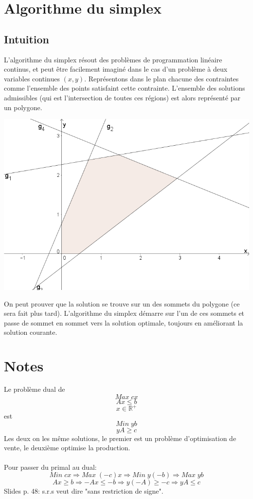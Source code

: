 \documentclass[a4paper]{report}
\theoremstyle{definition}
\theoremstyle{remark}
\theoremstyle{plain}
\begin{document}
\section{Algorithme du simplex}
\subsection{Intuition}
L'algorithme du simplex résout des problèmes de programmation linéaire continus,
et peut être facilement imaginé dans le cas d'un problème à deux variables
continues \((x,y)\). Représentons dans le plan chacune des contraintes comme
l'ensemble des points satisfaint cette contrainte. L'ensemble des solutions
admissibles (qui est l'intersection de toutes ces régions) est alors représenté
par un polygone.
\begin{center}\textbf{\textbf{}}
\includegraphics[width=\textwidth]{simplex-xy.png}
\end{center}
On peut prouver que la solution se trouve sur un des sommets du polygone (ce
sera fait plus tard). L'algorithme du simplex démarre sur l'un de ces sommets et
passe de sommet en sommet vers la solution optimale, toujours en améliorant la
solution courante.

\section{Notes}
Le problème dual de
\[Max\;cx\]
\[Ax\le b\]
\[x\in\mathbb{R}^+\]
est
\[Min\;yb\]
\[yA\ge c\]
Les deux on les même solutions, le premier est un problème d'optimisation de
vente, le deuxième optimise la production.
\paragraph{}
Pour passer du primal au dual:
\[Min\;cx\Rightarrow Max\;(-c)x\Rightarrow Min\;y(-b)\Rightarrow Max\;yb\]
\[Ax\ge b\Rightarrow -Ax\le -b\Rightarrow y(-A)\ge -c\Rightarrow yA\le c\]
Slides p. 48: s.r.s veut dire "sans restriction de signe".
\end{document}
